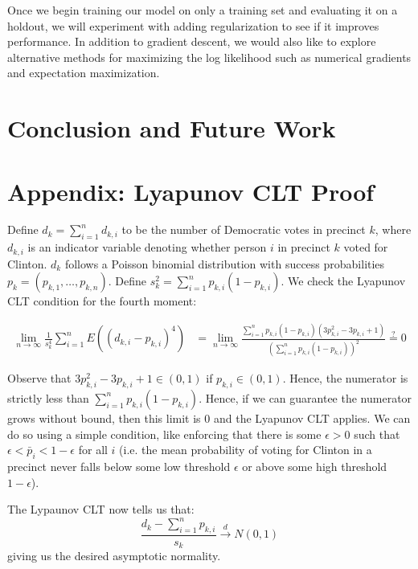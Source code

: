 \documentclass[10pt, letterpaper]{article}
\begin{document}
Once we begin training our model on only a training set and evaluating it on a holdout, we will experiment with adding regularization to see if it improves performance. In addition to gradient descent, we would also like to explore alternative methods for maximizing the log likelihood such as numerical gradients and expectation maximization.

\section{Conclusion and Future Work}

\section*{Appendix: Lyapunov CLT Proof}

Define $d_k = \sum_{i = 1}^n d_{k, i}$ to be the number of Democratic votes in precinct $k$, where $d_{k, i}$ is an indicator variable denoting whether person $i$ in precinct $k$ voted for Clinton. $d_k$ follows a Poisson binomial distribution with success probabilities $p_k = (p_{k, 1}, \dots, p_{k, n})$. Define $s_{k}^2 = \sum_{i = 1}^{n} p_{k, i} (1-p_{k, i})$. 
We check the Lyapunov CLT \cite{billingsley1995probability} condition for the fourth moment: 

\begin{align*}
\lim_{n \to \infty} \frac{1}{s_k^4} \sum_{i = 1}^n E \left( (d_{k, i} - p_{k, i})^4 \right) &= \lim_{n \to \infty} \frac{\sum_{i = 1}^n p_{k, i}(1-p_{k, i}) \left( 3p_{k, i}^2 - 3p_{k, i} + 1 \right)}{\left(\sum_{i = 1}^n p_{k, i} \left( 1- p_{k, i} \right) \right)^2} \stackrel{?} = 0 
\end{align*}

Observe that $3p_{k, i}^2 - 3p_{k, i} + 1 \in (0, 1)$ if $p_{k, i} \in (0, 1)$. Hence, the numerator is strictly less than $\sum_{i = 1}^n p_{k, i} (1 - p_{k, i})$. Hence, if we can guarantee the numerator grows without bound, then this limit is 0 and the Lyapunov CLT applies. We can do so using a simple condition, like enforcing that there is some $\epsilon > 0$ such that $\epsilon < \bar p_i < 1- \epsilon$ for all $i$ (i.e. the mean probability of voting for Clinton in a precinct never falls below some low threshold $\epsilon$ or above some high threshold $1-\epsilon$). 

The Lypaunov CLT now tells us that: 
\[ \frac{d_k - \sum_{i = 1}^{n} p_{k, i} }{s_k} \stackrel{d} \longrightarrow N(0, 1) \] 
giving us the desired asymptotic normality. 
\end{document}
